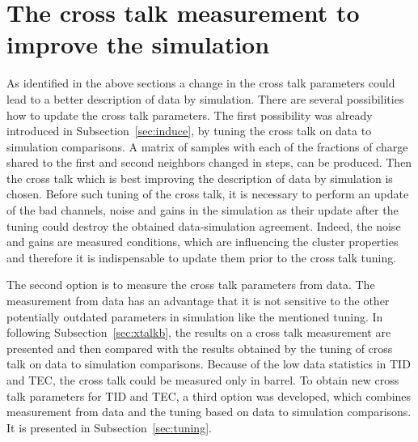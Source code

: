 

\section{The cross talk measurement to improve the simulation~\label{sec:xtalk}}

As identified in the above sections a change in the cross talk parameters could lead to a better description of data by simulation. There are several possibilities how to update the cross talk parameters. The first possibility was already introduced in Subsection~\ref{sec:induce}, by tuning the cross talk on data to simulation comparisons. A matrix of samples with each of the fractions of charge shared to the first and second neighbors changed in steps, can be produced. Then the cross talk which is best improving the description of data by simulation is chosen. Before such tuning of the cross talk, it is necessary to perform an update of the bad channels, noise and gains in the simulation as their update after the tuning could destroy the obtained data-simulation agreement. Indeed, the noise and gains are measured conditions, which are influencing the cluster properties and therefore it is indispensable to update them prior to the cross talk tuning.


The second option is to measure the cross talk parameters from data. The measurement from data has an advantage that it is not sensitive to the other potentially outdated parameters in simulation like the mentioned tuning. In following Subsection~\ref{sec:xtalkb}, the results on a cross talk measurement are presented and then compared with the results obtained by the tuning of cross talk on data to simulation comparisons. Because of the low data statistics in TID and TEC, the cross talk could be measured only in barrel. To obtain new cross talk parameters for TID and TEC, a third option was developed, which combines measurement from data and the tuning based on data to simulation comparisons. It is presented in Subsection~\ref{sec:tuning}.

